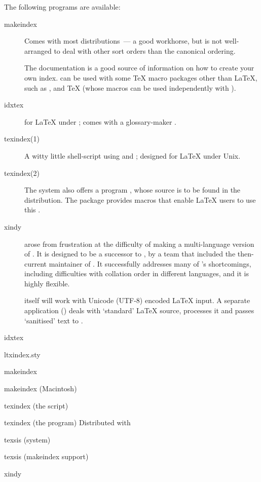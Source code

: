 The following programs are available:
\begin{description}
\item[makeindex] Comes with most distributions~--- a good workhorse,
  but is not well-arranged to deal with other sort orders than the
  canonical  ordering.
  
  The  documentation is a good source of
  information on how to create your own index.  can
  be used with some \TeX{}
  macro packages other than \LaTeX{}, such as \nothtml{\Eplain\ (}%
  \nothtml{)}, and \TeX{} (whose macros can
  be used independently with \plaintex{}).
\item[idxtex] for \LaTeX{} under ;  comes
  with a glossary-maker .
\item[texindex(1)] A witty little shell-script using 
  and ; designed for \LaTeX{} under Unix.
\item[texindex(2)] The  system also offers a program
  , whose source is to be found in the
   distribution.  The  package
  provides macros that enable \LaTeX{} users to use this
  .
\item[xindy] arose from frustration at the difficulty of making a
  multi-language version of .  It is designed to
  be a successor to , by a team that included the
  then-current maintainer of .  It successfully
  addresses many of 's shortcomings, including
  difficulties with collation order in different languages, and it is
  highly flexible.

   itself will work with Unicode (UTF-8) encoded
  \LaTeX{} input.  A separate application () deals
  with `standard' \LaTeX{} source, processes it and passes
  `sanitised' text to .
\end{description}
\begin{ctanrefs}
\item[idxtex]
\item[ltxindex.sty]
\item[makeindex]
\item[makeindex (Macintosh)]
\item[texindex \nothtml{\upshape\rmfamily}(the script)]
\item[texindex \nothtml{\upshape\rmfamily}(the program)]Distributed
  with 
\item[texsis (system)]
\item[texsis (makeindex support)]
\item[xindy]
\end{ctanrefs}

